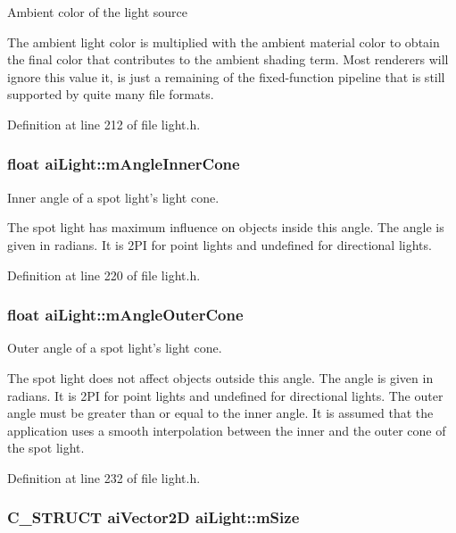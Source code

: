 Ambient color of the light source

The ambient light color is multiplied with the ambient material color to obtain the final color that contributes to the ambient shading term. Most renderers will ignore this value it, is just a remaining of the fixed-function pipeline that is still supported by quite many file formats. 

Definition at line 212 of file light.h.\hypertarget{structai_light_bad0466811938623e98bf1d334143f9a}{
\subsubsection[mAngleInnerCone]{\setlength{\rightskip}{0pt plus 5cm}float {\bf aiLight::mAngleInnerCone}}}
\label{structai_light_bad0466811938623e98bf1d334143f9a}


Inner angle of a spot light's light cone.

The spot light has maximum influence on objects inside this angle. The angle is given in radians. It is 2PI for point lights and undefined for directional lights. 

Definition at line 220 of file light.h.\hypertarget{structai_light_20fd332a5f9d8e8cb94816ff2b0ae7f4}{
\subsubsection[mAngleOuterCone]{\setlength{\rightskip}{0pt plus 5cm}float {\bf aiLight::mAngleOuterCone}}}
\label{structai_light_20fd332a5f9d8e8cb94816ff2b0ae7f4}


Outer angle of a spot light's light cone.

The spot light does not affect objects outside this angle. The angle is given in radians. It is 2PI for point lights and undefined for directional lights. The outer angle must be greater than or equal to the inner angle. It is assumed that the application uses a smooth interpolation between the inner and the outer cone of the spot light. 

Definition at line 232 of file light.h.\hypertarget{structai_light_e2494aac85acce5e4fa3920b92b9d7b5}{
\subsubsection[mSize]{\setlength{\rightskip}{0pt plus 5cm}C\_\-STRUCT {\bf aiVector2D} {\bf aiLight::mSize}}}
\label{structai_light_e2494aac85acce5e4fa3920b92b9d7b5}


